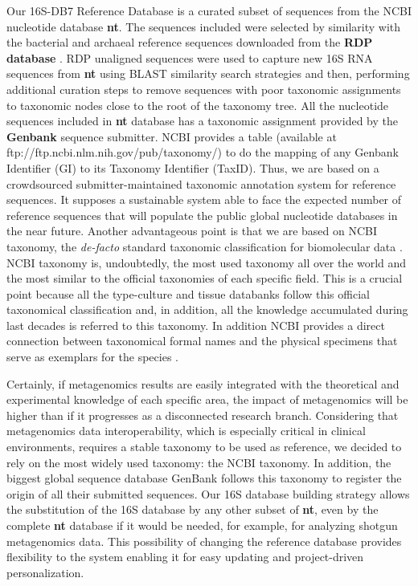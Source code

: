 \documentclass[fontsize=8pt,paper=a4,pagesize,abstracton]{scrartcl}
\begin{document}
Our 16S-DB7 Reference Database is a curated subset of sequences from the
NCBI nucleotide database \textbf{nt}. The sequences included were
selected by similarity with the bacterial and archaeal reference
sequences downloaded from the \textbf{RDP database}
\autocite{cole2013ribosomal}. RDP unaligned sequences were used to
capture new 16S RNA sequences from \textbf{nt} using BLAST similarity
search strategies and then, performing additional curation steps to
remove sequences with poor taxonomic assignments to taxonomic nodes
close to the root of the taxonomy tree. All the nucleotide sequences
included in \textbf{nt} database has a taxonomic assignment provided by
the \textbf{Genbank} sequence submitter. NCBI provides a table
(available at ftp://ftp.ncbi.nlm.nih.gov/pub/taxonomy/) to do the
mapping of any Genbank Identifier (GI) to its Taxonomy Identifier
(TaxID). Thus, we are based on a crowdsourced submitter-maintained
taxonomic annotation system for reference sequences. It supposes a
sustainable system able to face the expected number of reference
sequences that will populate the public global nucleotide databases in
the near future. Another advantageous point is that we are based on NCBI
taxonomy, the \emph{de-facto} standard taxonomic classification for
biomolecular data \autocite{cochrane20102010}. NCBI taxonomy is,
undoubtedly, the most used taxonomy all over the world and the most
similar to the official taxonomies of each specific field. This is a
crucial point because all the type-culture and tissue databanks follow
this official taxonomical classification and, in addition, all the
knowledge accumulated during last decades is referred to this taxonomy.
In addition NCBI provides a direct connection between taxonomical formal
names and the physical specimens that serve as exemplars for the species
\autocite{federhen2014type}.

Certainly, if metagenomics results are easily integrated with the
theoretical and experimental knowledge of each specific area, the impact
of metagenomics will be higher than if it progresses as a disconnected
research branch. Considering that metagenomics data interoperability,
which is especially critical in clinical environments, requires a stable
taxonomy to be used as reference, we decided to rely on the most widely
used taxonomy: the NCBI taxonomy. In addition, the biggest global
sequence database GenBank follows this taxonomy to register the origin
of all their submitted sequences. Our 16S database building strategy
allows the substitution of the 16S database by any other subset of
\textbf{nt}, even by the complete \textbf{nt} database if it would be
needed, for example, for analyzing shotgun metagenomics data. This
possibility of changing the reference database provides flexibility to
the system enabling it for easy updating and project-driven
personalization.
\end{document}
